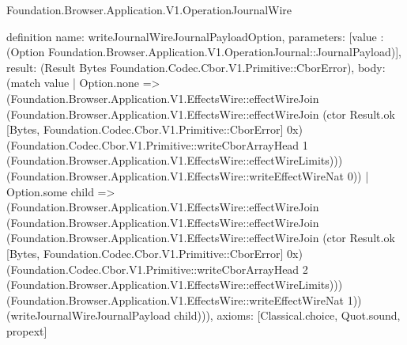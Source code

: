 \begin{lexlean}{Foundation.Browser.Application.V1.OperationJournalWire}
\begin{semanticmodule}
definition{
  name: writeJournalWireJournalPayloadOption,
  parameters: [value : (Option Foundation.Browser.Application.V1.OperationJournal::JournalPayload)],
  result: (Result Bytes Foundation.Codec.Cbor.V1.Primitive::CborError),
  body: (match value
    | Option.none => (Foundation.Browser.Application.V1.EffectsWire::effectWireJoin (Foundation.Browser.Application.V1.EffectsWire::effectWireJoin (ctor Result.ok [Bytes, Foundation.Codec.Cbor.V1.Primitive::CborError] 0x) (Foundation.Codec.Cbor.V1.Primitive::writeCborArrayHead 1 (Foundation.Browser.Application.V1.EffectsWire::effectWireLimits))) (Foundation.Browser.Application.V1.EffectsWire::writeEffectWireNat 0))
    | Option.some child => (Foundation.Browser.Application.V1.EffectsWire::effectWireJoin (Foundation.Browser.Application.V1.EffectsWire::effectWireJoin (Foundation.Browser.Application.V1.EffectsWire::effectWireJoin (ctor Result.ok [Bytes, Foundation.Codec.Cbor.V1.Primitive::CborError] 0x) (Foundation.Codec.Cbor.V1.Primitive::writeCborArrayHead 2 (Foundation.Browser.Application.V1.EffectsWire::effectWireLimits))) (Foundation.Browser.Application.V1.EffectsWire::writeEffectWireNat 1)) (writeJournalWireJournalPayload child))),
  axioms: [Classical.choice, Quot.sound, propext]
}


\end{semanticmodule}
\end{lexlean}
